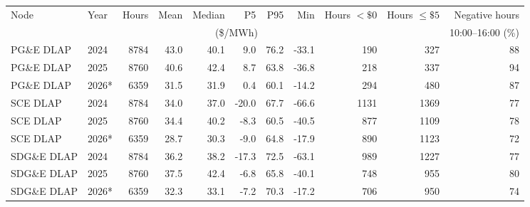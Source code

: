 \begin{tabular}{llrrrrrrrrr}
\toprule
Node & Year & Hours & Mean & Median & P5 & P95 & Min & Hours $<\$0$ & Hours $\le\$5$ & Negative hours \\
 & & & \multicolumn{5}{c}{(\$/MWh)} & & & 10:00--16:00 (\%) \\
\midrule
PG\&E DLAP & 2024 & 8784 & 43.0 & 40.1 & 9.0 & 76.2 & -33.1 & 190 & 327 & 88 \\
PG\&E DLAP & 2025 & 8760 & 40.6 & 42.4 & 8.7 & 63.8 & -36.8 & 218 & 337 & 94 \\
PG\&E DLAP & 2026* & 6359 & 31.5 & 31.9 & 0.4 & 60.1 & -14.2 & 294 & 480 & 87 \\
SCE DLAP & 2024 & 8784 & 34.0 & 37.0 & -20.0 & 67.7 & -66.6 & 1131 & 1369 & 77 \\
SCE DLAP & 2025 & 8760 & 34.4 & 40.2 & -8.3 & 60.5 & -40.5 & 877 & 1109 & 78 \\
SCE DLAP & 2026* & 6359 & 28.7 & 30.3 & -9.0 & 64.8 & -17.9 & 890 & 1123 & 72 \\
SDG\&E DLAP & 2024 & 8784 & 36.2 & 38.2 & -17.3 & 72.5 & -63.1 & 989 & 1227 & 77 \\
SDG\&E DLAP & 2025 & 8760 & 37.5 & 42.4 & -6.8 & 65.8 & -40.1 & 748 & 955 & 80 \\
SDG\&E DLAP & 2026* & 6359 & 32.3 & 33.1 & -7.2 & 70.3 & -17.2 & 706 & 950 & 74 \\
\bottomrule
\end{tabular}